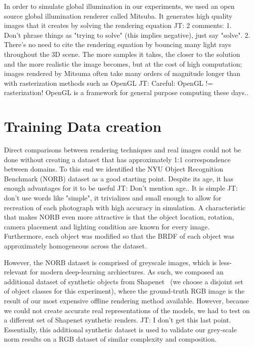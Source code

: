 \documentclass[10pt,twocolumn,letterpaper]{article}
\newcommand{\tompson}[1]{{\color{green} JT: #1}}
\begin{document}
In order to simulate global illumination in our experiments, we used an open source global illumination renderer called Mitsuba\cite{Mitsuba}.  It generates high quality images that it creates by solving the rendering equation \cite{Kajiya:1984:RTV:800031.808594} \tompson{2 comments: 1. Don't phrase things as "trying to solve" (this implies negative), just say "solve". 2. There's no need to cite the rendering equation} by bouncing many light rays throughout the 3D scene.  The more samples it takes, the closer to the solution and the more realistic the image becomes, but at the cost of high computation; images rendered by Mitsuma often take many orders of magnitude longer than with rasterization methods such as OpenGL \tompson{Careful: OpenGL != rasterization! OpenGL is a framework for general purpose computing these days.}.  

\section{Training Data creation}
Direct comparisons between rendering techniques and real images could not be done without creating a dataset that has approximately 1:1 correspondence between domains.  To this end we identified the NYU Object Recognition Benchmark (NORB) dataset \cite{LeCun:2004:LMG:1896300.1896315} as a good starting point. Despite its age, it has enough advantages for it to be useful \tompson{Don't mention age.}.  It is simple\tompson{don't use words like "simple", it trivializes} and small enough to allow for recreation of each photograph with high accuracy in simulation.  A characteristic that makes NORB even more attractive is that the object location, rotation, camera placement and lighting condition are known for every image. Furthermore, each object was modified so that the BRDF of each object was approximately homogeneous across the dataset.

However, the NORB dataset is comprised of greyscale images, which is less-relevant for modern deep-learning archiectures. As such, we composed an additional dataset of synthetic objects from Shapenet~\cite{DBLP:journals/corr/ChangFGHHLSSSSX15} (we choose a disjoint set of object classes for this experiment), where the ground-truth RGB image is the result of our most expensive offline rendering method available. However, because we could not create accurate real representations of the models, we had to test on a different set of Shapenet synthetic renders. \tompson{I don't get this last point.} Essentially, this additional synthetic dataset is used to validate our grey-scale norm results on a RGB dataset of similar complexity and composition.
\end{document}
